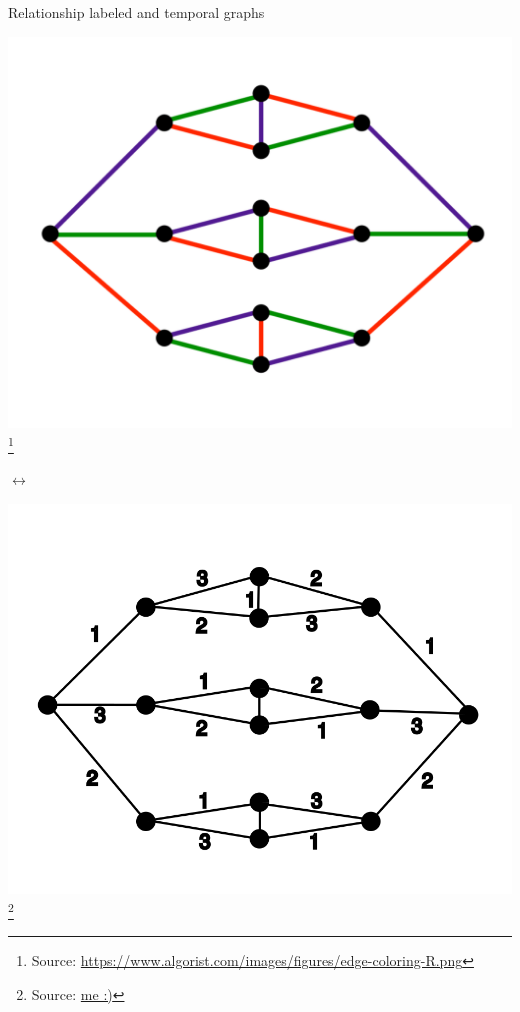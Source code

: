 \documentclass{beamer}
\newcommand{\sourcefootnote}[1]{\let\thefootnote\relax\footnote{{\tiny Source: \url{#1}}}}
\begin{document}
\begin{frame}{Relationship labeled and temporal graphs}
  \begin{minipage}{0.45\textwidth}
    \includegraphics[width=\linewidth]{media/proper_edge_coloring.png}
    \sourcefootnote{https://www.algorist.com/images/figures/edge-coloring-R.png}
  \end{minipage}
  \hfill $\leftrightarrow$ \hfill
  \begin{minipage}{0.45\textwidth}
  \includegraphics[width=\linewidth]{media/edge_coloring_to_temporal_graph.png}
  \sourcefootnote{me :)}
  \end{minipage}
\end{frame}
\end{document}
